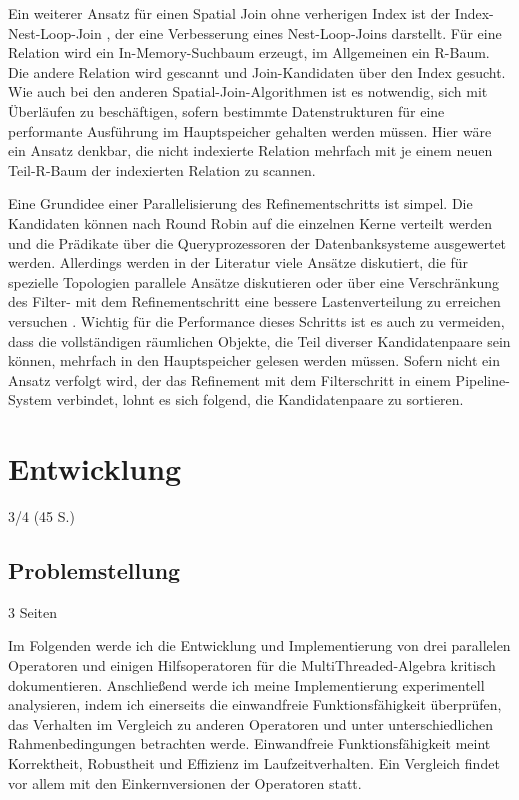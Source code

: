 \documentclass[a4paper,12pt,twoside]{article}
\begin{document}
Ein weiterer Ansatz für einen Spatial Join ohne verherigen Index ist der Index-Nest-Loop-Join {\autocite[S. 10f]{Jacox2007}}, der eine Verbesserung eines Nest-Loop-Joins 
darstellt. Für eine Relation wird ein In-Memory-Suchbaum erzeugt, im Allgemeinen ein R-Baum. Die andere Relation wird gescannt und Join-Kandidaten über den Index gesucht. Wie auch bei den anderen Spatial-Join-Algorithmen ist es notwendig, sich mit Überläufen zu beschäftigen, sofern bestimmte Datenstrukturen für eine performante Ausführung im Hauptspeicher gehalten werden müssen. Hier wäre ein Ansatz denkbar, die nicht indexierte Relation mehrfach mit je einem neuen Teil-R-Baum der indexierten Relation zu scannen. 

Eine Grundidee einer Parallelisierung des Refinementschritts ist simpel. Die Kandidaten können nach Round Robin auf die einzelnen Kerne verteilt werden und die Prädikate über die Queryprozessoren der Datenbanksysteme ausgewertet werden. Allerdings werden in der Literatur viele Ansätze diskutiert, die für spezielle Topologien parallele Ansätze diskutieren {\autocite{Bouros2019, Rigaux2001}} oder über eine Verschränkung des Filter- mit dem Refinementschritt eine bessere Lastenverteilung zu erreichen versuchen {\autocite{Brinkhoff1996, Jacox2007, Zhou1998}}. Wichtig für die Performance dieses Schritts ist es auch zu vermeiden, dass die vollständigen räumlichen Objekte, die Teil diverser Kandidatenpaare sein können, mehrfach in den Hauptspeicher gelesen werden müssen. Sofern nicht ein Ansatz verfolgt wird, der das Refinement mit dem Filterschritt in einem Pipeline-System verbindet, lohnt es sich {\textcite[ S. 45f]{Jacox2007}} folgend, die Kandidatenpaare zu sortieren.

\section{Entwicklung}
3/4 (45 S.)

\subsection{Problemstellung} 3 Seiten

Im Folgenden werde ich die Entwicklung und Implementierung von drei parallelen Operatoren und einigen Hilfsoperatoren für die MultiThreaded-Algebra kritisch dokumentieren. Anschließend werde ich meine Implementierung experimentell analysieren, indem ich einerseits die einwandfreie Funktionsfähigkeit überprüfen, das Verhalten im Vergleich zu anderen Operatoren und unter unterschiedlichen Rahmenbedingungen betrachten werde. Einwandfreie Funktionsfähigkeit meint Korrektheit, Robustheit und Effizienz im Laufzeitverhalten. Ein Vergleich findet vor allem mit den Einkernversionen der Operatoren statt.
\end{document}
